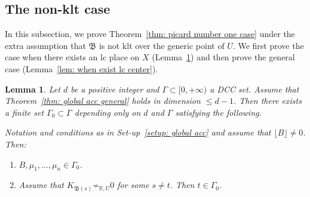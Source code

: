 \documentclass[11pt,reqno]{amsart}
\numberwithin{equation}{section}
\newcommand{\Bb}{{\mathfrak{B}}}
\newcommand{\Ii}{\Gamma}
\newtheorem{lem}[thm]{Lemma}
\theoremstyle{definition}
\begin{document}
\subsection{The non-klt case}

In this subsection, we prove Theorem~\ref{thm: picard number one case} under the extra assumption that $\Bb$ is not klt over the generic point of $U$. We first prove the case when there exists an lc place on $X$ (Lemma~\ref{lem: when exist lc place}) and then prove the general case (Lemma~\ref{lem: when exist lc center}).

\begin{lem}\label{lem: when exist lc place}
Let $d$ be a positive integer and $\Ii\subset [0,+\infty)$ a DCC set. Assume that Theorem~\ref{thm: global acc general} holds in dimension $\leq d-1$. Then there exists a finite set $\Ii_0\subset\Ii$ depending only on $d$ and $\Ii$ satisfying the following.

Notation and conditions as in Set-up~\ref{setup: global acc} and assume that $\lfloor B\rfloor\neq0$. Then:
\begin{enumerate}
    \item $B,\mu_1,\dots,\mu_n\in\Ii_0$.
    \item Assume that $K_{\Bb(s)}\not\sim_{\mathbb R,U}0$ for some $s\neq t$. Then $t\in\Ii_0$.
\end{enumerate}
\end{lem}
\end{document}
